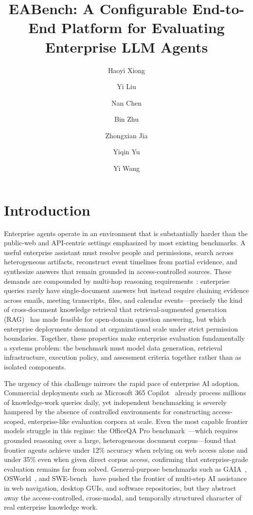 \documentclass[journal,dvipsnames]{acmart}
\title{EABench: A Configurable End-to-End Platform for Evaluating Enterprise LLM Agents}
\author{Haoyi Xiong}
\affiliation{%
  \institution{Microsoft Corporation}
  \city{Beijing}
  \country{China}
}
\author{Yi Liu}
\affiliation{%
  \institution{Microsoft Corporation}
  \city{Beijing}
  \country{China}
}
\author{Nan Chen}
\affiliation{%
  \institution{Microsoft Corporation}
  \city{Beijing}
  \country{China}
}
\author{Bin Zhu}
\affiliation{%
  \institution{Microsoft Corporation}
  \city{Beijing}
  \country{China}
}
\author{Zhongxian Jia}
\affiliation{%
  \institution{Microsoft Corporation}
  \city{Beijing}
  \country{China}
}
\author{Yiqin Yu}
\affiliation{%
  \institution{Microsoft Corporation}
  \city{Beijing}
  \country{China}
}
\author{Yi Wang}
\affiliation{%
  \institution{Microsoft Corporation}
  \city{Beijing}
  \country{China}
}
\begin{document}
\maketitle

\section{Introduction}
\label{sec:intro}
Enterprise agents operate in an environment that is substantially harder than the public-web and API-centric settings emphasized by most existing benchmarks. A useful enterprise assistant must resolve people and permissions, search across heterogeneous artifacts, reconstruct event timelines from partial evidence, and synthesize answers that remain grounded in access-controlled sources. These demands are compounded by multi-hop reasoning requirements~\cite{yang2018hotpotqa}: enterprise queries rarely have single-document answers but instead require chaining evidence across emails, meeting transcripts, files, and calendar events---precisely the kind of cross-document knowledge retrieval that retrieval-augmented generation (RAG)~\cite{lewis2020rag} has made feasible for open-domain question answering, but which enterprise deployments demand at organizational scale under strict permission boundaries. Together, these properties make enterprise evaluation fundamentally a systems problem: the benchmark must model data generation, retrieval infrastructure, execution policy, and assessment criteria together rather than as isolated components.

The urgency of this challenge mirrors the rapid pace of enterprise AI adoption. Commercial deployments such as Microsoft 365 Copilot~\cite{microsoft2023copilot} already process millions of knowledge-work queries daily, yet independent benchmarking is severely hampered by the absence of controlled environments for constructing access-scoped, enterprise-like evaluation corpora at scale. Even the most capable frontier models struggle in this regime: the OfficeQA Pro benchmark~\cite{opsahlong2026officeqapro}---which requires grounded reasoning over a large, heterogeneous document corpus---found that frontier agents achieve under 12\% accuracy when relying on web access alone and under 35\% even when given direct corpus access, confirming that enterprise-grade evaluation remains far from solved. General-purpose benchmarks such as GAIA~\cite{mialon2023gaia}, OSWorld~\cite{xie2024osworld}, and SWE-bench~\cite{jimenez2024swebench} have pushed the frontier of multi-step AI assistance in web navigation, desktop GUIs, and software repositories, but they abstract away the access-controlled, cross-modal, and temporally structured character of real enterprise knowledge work.
\end{document}
